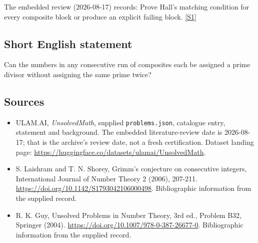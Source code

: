 \documentclass[11pt,a4paper]{article}
\newcommand{\sref}[2]{\hyperlink{source:#1:#2}{[S#2]}}
\begin{document}
The embedded review (2026-08-17) records: Prove Hall's matching condition for every composite block or produce an explicit failing block. \sref{statement}{1}

\subsection{Short English statement}

Can the numbers in any consecutive run of composites each be assigned a prime divisor without assigning the same prime twice?

\subsection{Sources}

{\small

\begin{itemize}

\item[\hypertarget{source:statement:1}{S1}] ULAM.AI, \emph{UnsolvedMath}, supplied \texttt{problems.json}, catalogue entry, statement and background. The embedded literature-review date is 2026-08-17; that is the archive’s review date, not a fresh certification. Dataset landing page: \url{https://huggingface.co/datasets/ulamai/UnsolvedMath}.

\item[\hypertarget{source:statement:2}{S2}] S. Laishram and T. N. Shorey, Grimm's conjecture on consecutive integers, International Journal of Number Theory 2 (2006), 207-211. \url{https://doi.org/10.1142/S1793042106000498}. Bibliographic information from the supplied record.

\item[\hypertarget{source:statement:3}{S3}] R. K. Guy, Unsolved Problems in Number Theory, 3rd ed., Problem B32, Springer (2004). \url{https://doi.org/10.1007/978-0-387-26677-0}. Bibliographic information from the supplied record.

\end{itemize}

}

\label{end:statement}
\end{document}
